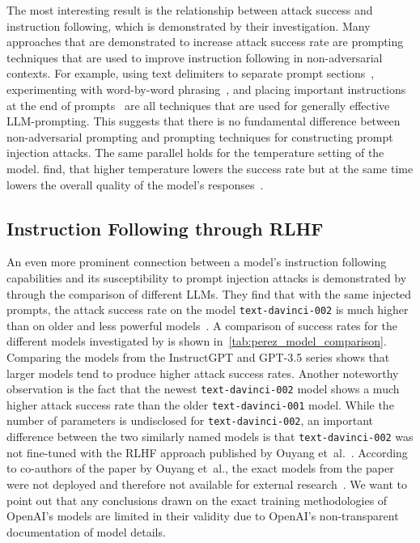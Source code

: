 The most interesting result is the relationship between attack success and instruction following, which is demonstrated by their investigation.
Many approaches that are demonstrated to increase attack success rate are prompting techniques that are used to improve instruction following in non-adversarial contexts.
For example, using text delimiters to separate prompt sections~\cite{schulhoff_prompt_2025}, experimenting with word-by-word phrasing~\cite{kamath_prompt-based_2024}, and placing important instructions at the end of prompts~\cite{schulhoff_prompt_2025} are all techniques that are used for generally effective LLM-prompting.
This suggests that there is no fundamental difference between non-adversarial prompting and prompting techniques for constructing prompt injection attacks.
The same parallel holds for the temperature setting of the model.
\perez find, that higher temperature lowers the success rate but at the same time lowers the overall quality of the model's responses~\cite{perez_ignore_2022}.\\

\subsection{Instruction Following through RLHF} \label{sec:RLHF_instr_following}
An even more prominent connection between a model's instruction following capabilities and its susceptibility to prompt injection attacks is demonstrated by \perez through the comparison of different LLMs.
They find that with the same injected prompts, the attack success rate on the model \texttt{text-davinci-002} is much higher than on older and less powerful models~\cite{perez_ignore_2022}.
A comparison of success rates for the different models investigated by \perez is shown in~\cref{tab:perez_model_comparison}.
Comparing the models from the InstructGPT and GPT-3.5 series shows that larger models tend to produce higher attack success rates. 
Another noteworthy observation is the fact that the newest \texttt{text-davinci-002} model shows a much higher attack success rate than the older \texttt{text-davinci-001} model.
While the number of parameters is undisclosed for \texttt{text-davinci-002}, an important difference between the two similarly named models is that \texttt{text-davinci-002} was not fine-tuned with the RLHF approach published by Ouyang et~al.~\cite{janus_update_2022, mcdonnell_openai_2022}.
According to co-authors of the paper by Ouyang et~al., the exact models from the paper were not deployed and therefore not available for external research~\cite{jan_leike_janleike_sarahwiegreffe_2022}.
We want to point out that any conclusions drawn on the exact training methodologies of OpenAI's models are limited in their validity due to OpenAI's non-transparent documentation of model details.\\

